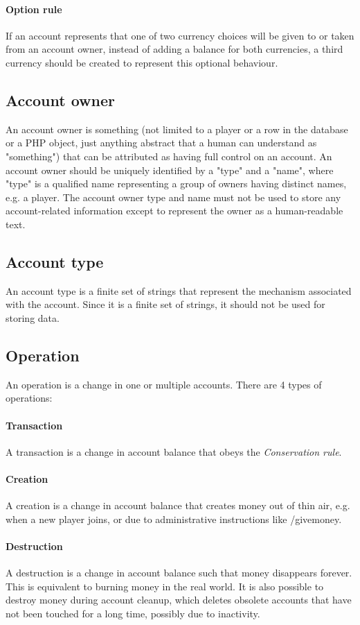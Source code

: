 \documentclass{report}
\begin{document}
				\paragraph{Option rule} If an account represents that one of two currency choices will be given to or taken from an account owner,
					instead of adding a balance for both currencies, a third currency should be created to represent this optional behaviour.

			\subsection{Account owner}
				An account owner is something (not limited to a player or a row in the database or a PHP object,
				just anything abstract that a human can understand as "something") that can be attributed as having full control on an account.
				An account owner should be uniquely identified by a "type" and a "name",
				where "type" is a qualified name representing a group of owners having distinct names, e.g. a player.
				The account owner type and name must not be used to store any account-related information except to represent the owner as a human-readable text.

			\subsection{Account type}
				An account type is a finite set of strings that represent the mechanism associated with the account.
				Since it is a finite set of strings, it should not be used for storing data.

			\subsection{Operation}
				An operation is a change in one or multiple accounts.
				There are 4 types of operations:
				\paragraph{Transaction} A transaction is a change in account balance that obeys the \textit{Conservation rule}.
				\paragraph{Creation} A creation is a change in account balance that creates money out of thin air,
					e.g. when a new player joins, or due to administrative instructions like /givemoney.
				\paragraph{Destruction} A destruction is a change in account balance such that money disappears forever.
					This is equivalent to burning money in the real world.
					It is also possible to destroy money during account cleanup, which
					deletes obsolete accounts that have not been touched for a long time, possibly due to inactivity.
\end{document}
